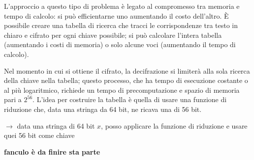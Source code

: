 \noindent L'approccio a questo tipo di problema è legato al compromesso tra memoria e tempo di calcolo: si può efficientarne uno aumentando 
il costo dell'altro. È possibile creare una tabella di ricerca che tracci le corrispondenze tra testo in chiaro e cifrato per ogni chiave possibile; 
si può calcolare l'intera tabella (aumentando i costi di memoria) o solo alcune voci (aumentando il tempo di calcolo).

\noindent Nel momento in cui si ottiene il cifrato, la decifrazione si limiterà alla sola ricerca della chiave nella tabella; questo processo, che ha 
tempo di esecuzione costante o al più logaritmico, richiede un tempo di precomputazione e spazio di memoria pari a $2^56$. L'idea per costruire
la tabella è quella di usare una funzione di riduzione che, data una stringa da 64 bit, ne ricava una di 56 bit. 

\noindent $\rightarrow$ data una stringa di 64 bit $x$, posso applicare la funzione di riduzione e usare quei 56 bit come chiave


\textbf{fanculo è da finire sta parte}








